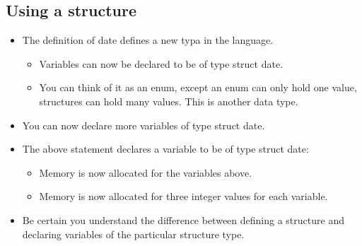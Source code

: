 \subsection{Using a structure}
\begin{itemize}
    \item The definition of date defines a new typa in the language.
        \begin{itemize}
            \item Variables can now be declared to be of type struct date. 
            \item You can think of it as an enum, except an enum can only hold one value, structures can hold many values. This is another data type.
        \end{itemize}

    \item You can now declare more variables of type struct date.
    
    \item The above statement declares a variable to be of type struct date:
        \begin{itemize}
            \item Memory is now allocated for the variables above. 
            \item Memory is now allocated for three integer values for each variable. 
        \end{itemize}
    
    \item Be certain you understand the difference between defining a structure and declaring variables of the particular structure type. 
\end{itemize}

